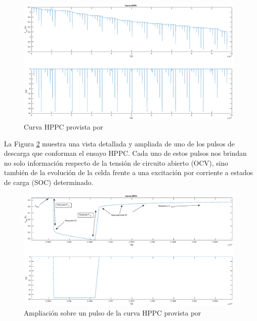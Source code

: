 \documentclass[10pt, a4paper]{report}
\begin{document}
\begin{figure}[h!]
    \begin{center}
        \includegraphics[width=.9\textwidth]{hppc_kollmeyer.eps}
        \caption{Curva HPPC provista por \cite{Kollmeyer2018}}
        \label{hppc_kollmeyer}
    \end{center}
\end{figure}
\FloatBarrier

La Figura \ref{hppc_kollmeyer_zoom} muestra una vista detallada y ampliada de
uno de los pulsos de descarga que conforman el ensayo \acrshort{HPPC}. Cada uno
de estos pulsos nos brindan no solo información respecto de la tensión de
circuito abierto (\acrshort{OCV}), sino también de la evolución de la celda
frente a una excitación por corriente a estados de carga (\acrshort{SOC})
determinado.

\begin{figure}[h!]
    \begin{center}
        \includegraphics[width=.9\textwidth]{hppc_kollmeyer_zoom.eps}
        \caption{Ampliaci\'on sobre un pulso de la curva HPPC provista por 
                 \cite{Kollmeyer2018}}
        \label{hppc_kollmeyer_zoom}
    \end{center}
\end{figure}
\FloatBarrier
\end{document}
